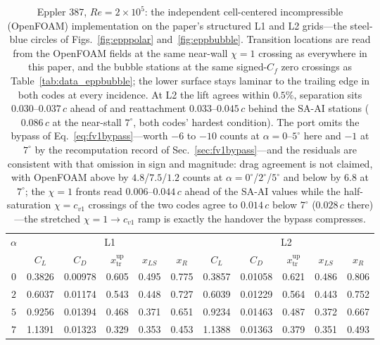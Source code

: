 \begin{table}[tp]
  \centering\small
  \caption{Eppler 387, $Re\!=\!2\!\times\!10^5$: the independent cell-centered incompressible (OpenFOAM) implementation on the paper's structured L1 and L2 grids---the steel-blue circles of Figs.~\ref{fig:epppolar} and~\ref{fig:eppbubble}. Transition locations are read from the OpenFOAM fields at the same near-wall $\chi\!=\!1$ crossing as everywhere in this paper, and the bubble stations at the same signed-$C_f$ zero crossings as Table~\ref{tab:data_eppbubble}; the lower surface stays laminar to the trailing edge in both codes at every incidence. At L2 the lift agrees within $0.5\%$, separation sits $0.030$--$0.037\,c$ ahead of and reattachment $0.033$--$0.045\,c$ behind the SA-AI stations ($0.086\,c$ at the near-stall $7^\circ$, both codes' hardest condition). The port omits the bypass of Eq.~\ref{eq:fv1bypass}---worth $-6$ to $-10$ counts at $\alpha\!=\!0$--$5^\circ$ here and $-1$ at $7^\circ$ by the recomputation record of Sec.~\ref{sec:fv1bypass}---and the residuals are consistent with that omission in sign and magnitude: drag agreement is not claimed, with OpenFOAM above by $4.8$/$7.5$/$1.2$ counts at $\alpha\!=\!0^\circ$/$2^\circ$/$5^\circ$ and below by $6.8$ at $7^\circ$; the $\chi\!=\!1$ fronts read $0.006$--$0.044\,c$ ahead of the SA-AI values while the half-saturation $\chi\!=\!c_{v1}$ crossings of the two codes agree to $0.014\,c$ below $7^\circ$ ($0.028\,c$ there)---the stretched $\chi\!=\!1\!\to\!c_{v1}$ ramp is exactly the handover the bypass compresses.}
  \label{tab:data_openfoam_eppler}
  \begin{tabular}{c ccccc ccccc}
    \toprule
    $\alpha$ & \multicolumn{5}{c}{L1} & \multicolumn{5}{c}{L2} \\ \cmidrule(lr){2-6}\cmidrule(lr){7-11} & $C_L$ & $C_D$ & $x_\mathrm{tr}^\mathrm{up}$ & $x_{LS}$ & $x_R$ & $C_L$ & $C_D$ & $x_\mathrm{tr}^\mathrm{up}$ & $x_{LS}$ & $x_R$ \\
    \midrule
    $0$ & 0.3826 & 0.00978 & 0.605 & 0.495 & 0.775 & 0.3857 & 0.01058 & 0.621 & 0.486 & 0.806 \\
    $2$ & 0.6037 & 0.01174 & 0.543 & 0.448 & 0.727 & 0.6039 & 0.01229 & 0.564 & 0.443 & 0.752 \\
    $5$ & 0.9256 & 0.01394 & 0.468 & 0.371 & 0.651 & 0.9234 & 0.01463 & 0.487 & 0.372 & 0.667 \\
    $7$ & 1.1391 & 0.01323 & 0.329 & 0.353 & 0.453 & 1.1388 & 0.01363 & 0.379 & 0.351 & 0.493 \\
    \bottomrule
  \end{tabular}
\end{table}
